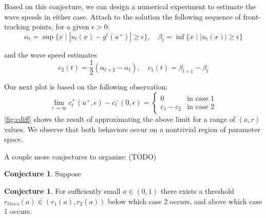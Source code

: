 \documentclass{article}
\theoremstyle{definition}
\newtheorem{proposition}[theorem]{Proposition}
\newtheorem{conjecture}[theorem]{Conjecture}
\numberwithin{equation}{section}
\begin{document}
Based on this conjecture, we can design a numerical experiment to estimate the wave speeds in either case.
Attach to the solution the following sequence of front-tracking points, for a given $\epsilon>0$:
$$ \alpha_t = \sup \{ x \mid |u_t(x) - g^t(u^+)| \geq \epsilon \}, \quad \beta_t = \inf \{ x \mid |u_t(x)| \geq \epsilon \} $$

and the wave speed estimates
$$ c_2(t)=\frac{1}{2}(\alpha_{t+2}-\alpha_t), \quad c_1(t)=\beta_{t+1}-\beta_t $$



Our next plot is based on the following observation:
$$ \lim_{t\to\infty}c_t^+(u^+,\epsilon)-c_t^-(0,\epsilon) = \begin{cases}
0 & \text{in case 1} \\
c_1-c_2 & \text{in case 2}
\end{cases} $$
\autoref{fig:cdiff} shows the result of approximating the above limit for a range of $(a, r)$ values.
We observe that both behaviors occur on a nontrivial region of parameter space.

A couple more conjectures to organize: (TODO)

\begin{conjecture}
Suppose 
\end{conjecture}

\begin{conjecture}
For sufficiently small $a \in (0,1)$ there exists a threshold $r_{thres}(a) \in (r_1(a),r_2(a))$ below which case 2 occurs, and above which case 1 occurs.
\end{conjecture}


\end{document}
